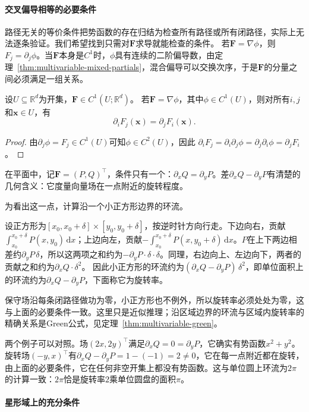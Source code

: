 \paragraph{交叉偏导相等的必要条件}

路径无关的等价条件把势函数的存在归结为检查所有路径或所有闭路径，实际上无法逐条验证。我们希望找到只需对$\bm F$求导就能检查的条件。
若$\bm F=\nabla\phi$，则$F_j=\partial_j\phi$。当$\bm F$本身是$C^1$时，$\phi$具有连续的二阶偏导数，由定理~\ref{thm:multivariable-mixed-partials}，混合偏导可以交换次序，于是$\bm F$的分量之间必须满足一组关系。
\begin{theorem}[保守场的必要条件]
设$U\subseteq\mathbb R^d$为开集，$\bm F\in C^1(U;\mathbb R^d)$。
若$\bm F=\nabla\phi$，其中$\phi\in C^1(U)$，则对所有$i,j$和$\bm x\in U$，有
\[
 \partial_iF_j(\bm x)=\partial_jF_i(\bm x).
\]
\end{theorem}
\begin{proof}
由$\partial_j\phi=F_j\in C^1(U)$可知$\phi\in C^2(U)$，因此
$\partial_iF_j=\partial_i\partial_j\phi=\partial_j\partial_i\phi=\partial_jF_i$。
\end{proof}

在平面中，记$\bm F=(P,Q)^\top$，条件只有一个：$\partial_xQ=\partial_yP$。差$\partial_xQ-\partial_yP$有清楚的几何含义：它度量向量场在一点附近的旋转程度。

为看出这一点，计算沿一个小正方形边界的环流。

设正方形为$[x_0,x_0+\delta]\times[y_0,y_0+\delta]$，按逆时针方向行走。下边向右，贡献$\int_{x_0}^{x_0+\delta}P(x,y_0)\,\mathrm dx$；上边向左，贡献$-\int_{x_0}^{x_0+\delta}P(x,y_0+\delta)\,\mathrm dx$。$P$在上下两边相差约$\partial_yP\,\delta$，所以这两项之和约为$-\partial_yP\cdot\delta\cdot\delta$。同理，右边向上、左边向下，两者的贡献之和约为$\partial_xQ\cdot\delta^2$。
因此小正方形的环流约为$(\partial_xQ-\partial_yP)\,\delta^2$，即单位面积上的环流约为$\partial_xQ-\partial_yP$，下面称它为旋转率。

保守场沿每条闭路径做功为零，小正方形也不例外，所以旋转率必须处处为零，这与上面的必要条件一致。这里只是近似推理；沿区域边界的环流与区域内旋转率的精确关系是Green公式，见定理~\ref{thm:multivariable-green}。

两个例子可以对照。场$(2x,2y)^\top$满足$\partial_xQ=0=\partial_yP$，它确实有势函数$x^2+y^2$。旋转场$(-y,x)^\top$有$\partial_xQ-\partial_yP=1-(-1)=2\neq0$，它在每一点附近都在旋转，由上面的必要条件，它在任何非空开集上都没有势函数。这与单位圆上环流为$2\pi$的计算一致：$2\pi$恰是旋转率$2$乘单位圆盘的面积$\pi$。

\paragraph{星形域上的充分条件}

